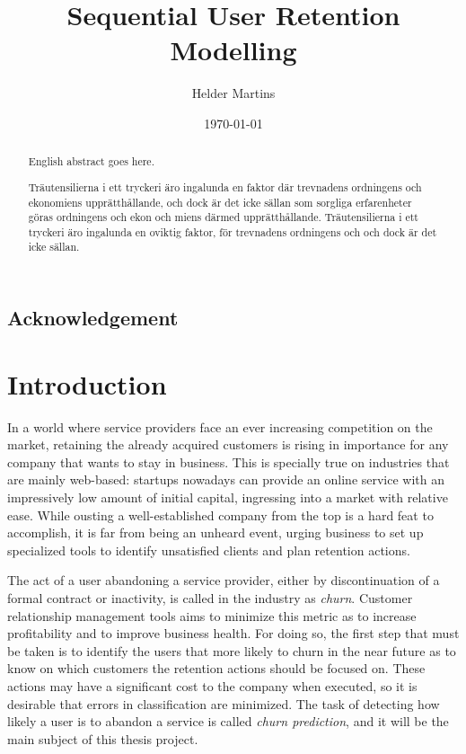 \documentclass{kththesis}
\title{Sequential User Retention Modelling}
\author{Helder Martins}
\date{\today}
\begin{document}
\flyleaf

\begin{abstract}
  English abstract goes here.
\end{abstract}

\clearpage

\begin{otherlanguage}{swedish}
  \begin{abstract}
    Träutensilierna i ett tryckeri äro ingalunda en faktor där
    trevnadens ordningens och ekonomiens upprätthållande, och dock är
    det icke sällan som sorgliga erfarenheter göras ordningens och
    ekon och miens därmed upprätthållande. Träutensilierna i ett
    tryckeri äro ingalunda en oviktig faktor, för trevnadens
    ordningens och och dock är det icke sällan.
  \end{abstract}
\end{otherlanguage}

\clearpage

\section*{Acknowledgement}


\cleardoublepage

\tableofcontents

\listoffigures
 
\listoftables


\mainmatter


\chapter{Introduction}

		In a world where service providers face an ever increasing competition on the market, retaining the already acquired customers is rising in importance for any company that wants to stay in business. This is specially true on industries that are mainly web-based: startups nowadays can provide an online service with  an impressively low amount of initial capital, ingressing into a market with relative ease. While ousting a well-established company from the top is a hard feat to accomplish, it is far from being an unheard event, urging business to set up specialized tools to identify unsatisfied clients and plan retention actions. 
		
	The act of a user abandoning a service provider, either by discontinuation of a formal contract or inactivity, is called in the industry as \emph{churn}. Customer relationship management tools  aims to minimize this metric as to increase profitability and to improve business health. For doing so, the first step that must be taken is to identify the users that more likely to churn in the near future as to know on which customers the retention actions should be focused on. These actions may have a significant cost to the company when executed, so it is desirable that errors in classification are minimized. The task of detecting how likely a user is to abandon a service is called \emph{churn prediction}, and it will be the main subject of this thesis project.
	
\end{document}
